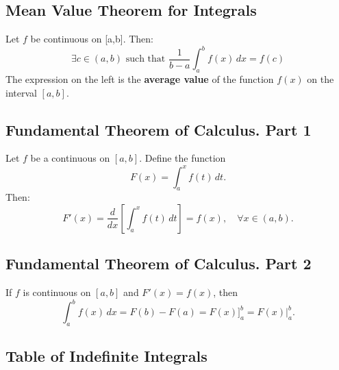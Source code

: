 \documentclass[a4paper,11pt]{article}
\begin{document}


\subsection{Mean Value Theorem for Integrals}

\begin{tcolorbox}
    Let $f$ be continuous on [a,b]. Then:
    \[
    \exists c \in (a,b) \text{ such that } \frac{1}{b - a} \int_{a}^{b} f(x) \, dx = f(c)
    \]
    The expression on the left is the \textbf{average value} of the function $f(x)$ on the interval $[a, b]$.
\end{tcolorbox}




\subsection{Fundamental Theorem of Calculus. Part 1}

\begin{tcolorbox}
    Let $f$ be a continuous on $[a, b]$. Define the function
    \[
    F(x) = \int_{a}^{x} f(t) \, dt.
    \]
    Then:
    \[
    F'(x) = \frac{d}{dx} \left[ \int_{a}^{x} f(t) \, dt \right] = f(x), \quad \forall x \in (a,b).
    \]
\end{tcolorbox}




\subsection{Fundamental Theorem of Calculus. Part 2}

\begin{tcolorbox}
    If $f$ is continuous on $[a,b]$ and $F'(x) = f(x)$, then
    \[
    \int_{a}^{b} f(x) \, dx = F(b) - F(a) =  F(x) \bigg]_{a}^{b} = F(x) \bigg|_{a}^{b}.
    \]
\end{tcolorbox}




\subsection{Table of Indefinite Integrals}
\end{document}
